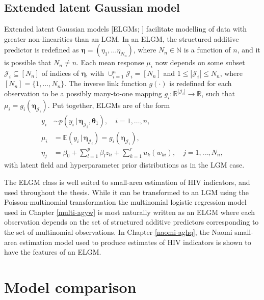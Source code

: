 \documentclass[a4paper, nobind]{templates/ociamthesis}
\begin{document}
\hypertarget{elgm}{%
\subsection{Extended latent Gaussian model}\label{elgm}}

Extended latent Gaussian models {[}ELGMs; \textcite{stringer2022fast}{]} facilitate modelling of data with greater non-linearities than an LGM.
In an ELGM, the structured additive predictor is redefined as \(\boldsymbol{\mathbf{\eta}} = (\eta_1, \ldots \eta_{N_n})\), where \(N_n \in \mathbb{N}\) is a function of \(n\), and it is possible that \(N_n \neq n\).
Each mean response \(\mu_i\) now depends on some subset \(\mathcal{J}_i \subseteq [N_n]\) of indices of \(\boldsymbol{\mathbf{\eta}}\), with \(\cup_{i = 1}^n \mathcal{J}_i = [N_n]\) and \(1 \leq |\mathcal{J}_i| \leq N_n\), where \([N_n] = \{1, \ldots, N_n\}\).
The inverse link function \(g(\cdot)\) is redefined for each observation to be a possibly many-to-one mapping \(g_i: \mathbb{R}^{|\mathcal{J}_i|} \to \mathbb{R}\), such that \(\mu_i = g_i(\boldsymbol{\mathbf{\eta}}_{\mathcal{J}_i})\).
Put together, ELGMs are of the form
\begin{align*}
y_i &\sim p(y_i \, | \, \boldsymbol{\mathbf{\eta}}_{\mathcal{J}_i}, \boldsymbol{\mathbf{\theta}}_1), \quad i = 1, \ldots, n, \\
\mu_i &= \mathbb{E}(y_i \, | \, \boldsymbol{\mathbf{\eta}}_{\mathcal{J}_i}) = g_i(\boldsymbol{\mathbf{\eta}}_{\mathcal{J}_i}), \\
\eta_j &= \beta_0 + \sum_{l = 1}^{p} \beta_l z_{li} + \sum_{k = 1}^{r} u_k(w_{ki}), \quad j = 1, \ldots, N_n,
\end{align*}
with latent field and hyperparameter prior distributions as in the LGM case.

The ELGM class is well suited to small-area estimation of HIV indicators, and used throughout the thesis.
While it can be transformed to an LGM using the Poisson-multinomial transformation \autocite{baker1994multinomial} the multinomial logistic regression model used in Chapter \ref{multi-agyw} is most naturally written as an ELGM where each observation depends on the set of structured additive predictors corresponding to the set of multinomial observations.
In Chapter \ref{naomi-aghq}, the Naomi small-area estimation model used to produce estimates of HIV indicators is shown to have the features of an ELGM.

\hypertarget{model-comparison}{%
\section{Model comparison}\label{model-comparison}}
\end{document}
